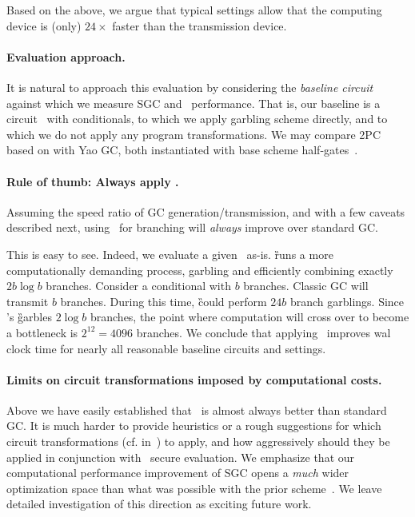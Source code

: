 Based on the above, we argue that typical settings allow that the
computing device is (only) $24\times$ faster than the transmission
device.




\paragraph{Evaluation approach.}  It is natural to approach this
evaluation by considering the {\em baseline circuit} against which we
measure SGC and \ourscheme\ performance.    That is, our baseline is a
circuit \cir\ with conditionals, to which we apply garbling scheme
directly, and to which we do not apply any program transformations.
We may compare 2PC based on \ourscheme with  Yao GC, both instantiated
with base scheme half-gates~\cite{EC:ZahRosEva15}.



\paragraph{Rule of thumb: Always apply \ourscheme.}  Assuming the
speed ratio of GC generation/transmission, and with a few caveats
described next, using \ourscheme\ for branching will {\em always}
improve over standard GC. 

This is easy to see.  Indeed, we evaluate a given \cir\ as-is.  \G
runs a more computationally demanding  process, garbling and
efficiently combining exactly $2 b \log b$ branches.  Consider a
conditional with $b$ branches.  Classic GC will transmit $b$ branches.
During this time, \G could perform $24 b$ branch garblings. Since
\ourscheme's \G garbles $2\log b$ branches, the point where
computation will cross over to become a bottleneck is $2^{12} = 4096$
branches.  We conclude that applying \ourscheme\ improves wal clock
time for nearly all reasonable baseline circuits and settings.


\paragraph{Limits on circuit transformations imposed by computational costs.}
Above we have easily  established that \ourscheme\ is almost always
better than standard GC.   It is much harder to provide heuristics or
a rough suggestions for which circuit transformations (cf.
in~) to apply, and how aggressively should
they be applied in conjunction with \ourscheme\ secure evaluation.  We
emphasize that our computational performance improvement of SGC opens
a {\em much} wider optimization space than what was possible with the
prior scheme~\HK.  We leave detailed investigation of this direction
as exciting future work.





